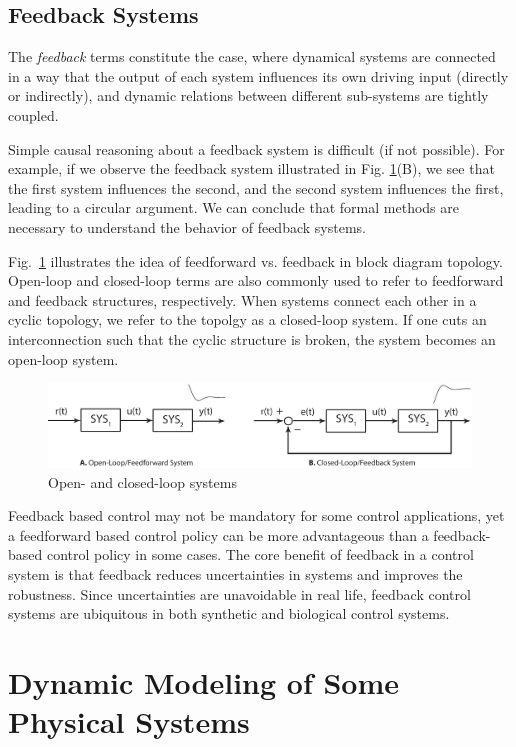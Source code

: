\documentclass[twoside]{article}
\begin{document}
\subsection*{Feedback Systems}

The \textit{feedback} terms constitute the case, where dynamical systems are connected in a way that the output of each system influences its own driving input (directly or indirectly), and dynamic relations between different sub-systems are tightly coupled. 

Simple causal reasoning about a feedback system is difficult (if not possible). For example, if we observe the feedback system illustrated in Fig. \ref{fig:closed_open}(B), we see that the first system influences the second, and the second system influences the first, leading to a circular argument. We can conclude that formal methods are necessary to understand the behavior of feedback systems. 

Fig.~\ref{fig:closed_open} illustrates the idea of feedforward vs. feedback in block diagram topology. Open-loop and closed-loop terms are also commonly used to refer to feedforward and feedback structures, respectively.  When systems connect each other in a cyclic topology, we refer to the topolgy as a closed-loop system. If one cuts an interconnection such that the cyclic structure is broken, the system becomes an open-loop system.

\begin{figure}[h]
	\centering
	\includegraphics[width=\textwidth]{closed_openloop}
	\caption{Open- and closed-loop systems}
	\label{fig:closed_open}
\end{figure}

Feedback based control may not be mandatory for some control applications, yet a feedforward based control policy can be more
advantageous than a feedback-based control policy in some cases. 
The core benefit of feedback in a control system is that feedback
reduces uncertainties in systems and improves the robustness. 
Since uncertainties are unavoidable in real life, feedback
control systems are ubiquitous in both synthetic and biological
control systems. 

\section*{Dynamic Modeling of Some Physical Systems}
\end{document}
